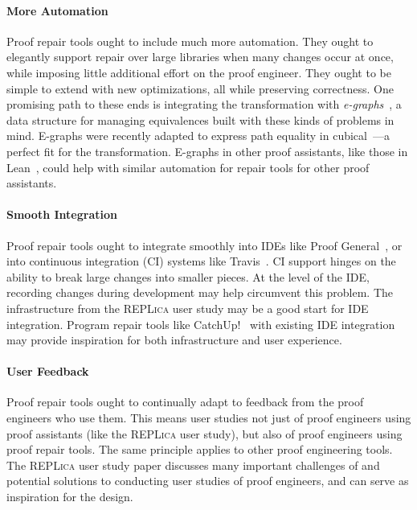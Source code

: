 \paragraph{More Automation}
Proof repair tools ought to include much more automation.
They ought to elegantly support repair over large libraries when many changes occur at once,
while imposing little additional effort on the proof engineer.
They ought to be simple to extend with new optimizations, all while preserving correctness.
One promising path to these ends is integrating the \toolnamec transformation with \textit{e-graphs}~\cite{egraph1},
a data structure %
for managing equivalences
built with these kinds of problems in mind.
E-graphs were recently adapted to express path equality in cubical~\cite{egraph6}---a perfect fit for the \toolnamec transformation.
E-graphs in other proof assistants, like those in Lean~\cite{selsam:lean}, could help with similar automation for repair tools for other proof assistants.

\paragraph{Smooth Integration}
Proof repair tools ought to integrate smoothly into IDEs like Proof General~\cite{proofgeneral},
or into continuous integration (CI) systems like Travis~\cite{travis}.
CI support hinges on the ability to break large changes into smaller pieces.
At the level of the IDE, recording changes during development may help circumvent this problem.
The infrastructure from the \textsc{REPLica} user study may be a good start for IDE integration.
Program repair tools like CatchUp!~\cite{Henkel:2005:CCR:1062455.1062512} with existing IDE integration may provide inspiration
for both infrastructure and user experience.

\paragraph{User Feedback} 
Proof repair tools ought to continually adapt to feedback from the proof engineers who use them.
This means user studies not just of proof engineers using proof assistants (like the \textsc{REPLica} user study),
but also of proof engineers using proof repair tools.
The same principle applies to other proof engineering tools.
The \textsc{REPLica} user study paper discusses many important challenges of and potential solutions to conducting user studies
of proof engineers, and can serve as inspiration for the design.

